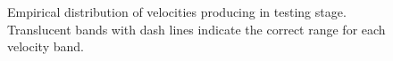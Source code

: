 \documentclass[
  12pt,
  letterpaper,
]{article}
\begin{document}
\begin{figure}


\caption{\label{fig-e1-test-vx}Empirical distribution of velocities
producing in testing stage. Translucent bands with dash lines indicate
the correct range for each velocity band.}

\end{figure}%
\end{document}
